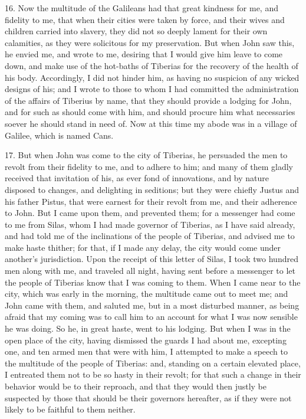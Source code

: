 16. Now the multitude of the Galileans had that great kindness for me, and
fidelity to me, that when their cities were taken by force, and their
wives and children carried into slavery, they did not so deeply lament for
their own calamities, as they were solicitous for my preservation. But
when John saw this, he envied me, and wrote to me, desiring that I would
give him leave to come down, and make use of the hot-baths of Tiberias for
the recovery of the health of his body. Accordingly, I did not hinder him,
as having no suspicion of any wicked designs of his; and I wrote to those
to whom I had committed the administration of the affairs of Tiberius by
name, that they should provide a lodging for John, and for such as should
come with him, and should procure him what necessaries soever he should
stand in need of. Now at this time my abode was in a village of Galilee,
which is named Cans.

17. But when John was come to the city of Tiberias, he persuaded the men
to revolt from their fidelity to me, and to adhere to him; and many of
them gladly received that invitation of his, as ever fond of innovations,
and by nature disposed to changes, and delighting in seditions; but they
were chiefly Justus and his father Pistus, that were earnest for their
revolt from me, and their adherence to John. But I came upon them, and
prevented them; for a messenger had come to me from Silas, whom I had made
governor of Tiberias, as I have said already, and had told me of the
inclinations of the people of Tiberias, and advised me to make haste
thither; for that, if I made any delay, the city would come under
another's jurisdiction. Upon the receipt of this letter of Silas, I took
two hundred men along with me, and traveled all night, having sent before
a messenger to let the people of Tiberias know that I was coming to them.
When I came near to the city, which was early in the morning, the
multitude came out to meet me; and John came with them, and saluted me,
but in a most disturbed manner, as being afraid that my coming was to call
him to an account for what I was now sensible he was doing. So he, in
great haste, went to his lodging. But when I was in the open place of the
city, having dismissed the guards I had about me, excepting one, and ten
armed men that were with him, I attempted to make a speech to the
multitude of the people of Tiberias: and, standing on a certain elevated
place, I entreated them not to be so hasty in their revolt; for that such
a change in their behavior would be to their reproach, and that they would
then justly be suspected by those that should be their governors
hereafter, as if they were not likely to be faithful to them neither.

